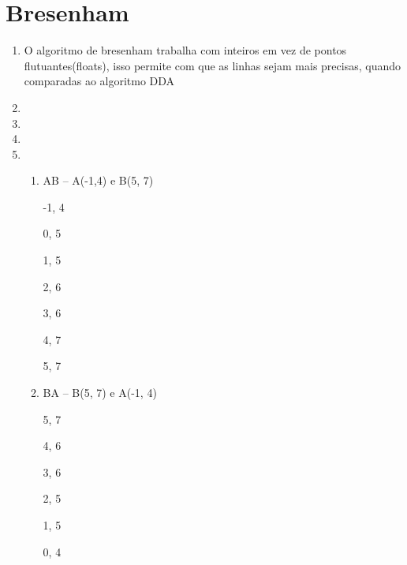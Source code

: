 \section*{Bresenham}

\begin{question}

	\begin{enumerate}\addtocounter{enumi}{10}
	
		\item O algoritmo de bresenham trabalha com inteiros em vez de pontos flutuantes(floats),
		isso permite com que as linhas sejam mais precisas, quando comparadas ao algoritmo DDA
		
		\item 

		\item 

		\item 

        \item \begin{enumerate}[label=\alph*.]
				   \setlength\itemsep{1em}
					\item	 AB – A(-1,4) e B(5, 7)
					   				
                       -1, 4
                       
                        0, 5
                        
                        1, 5
                        
                       2, 6
                       
                       3, 6
                       
                       4, 7
                       
                        5, 7
					
					\item    BA – B(5, 7) e A(-1, 4)
					
                           5, 7
                           
                          4, 6
                          
                          3, 6
                          
                          2, 5
                          
                          1, 5
                          
                         0, 4
                         

\end{enumerate}
\end{enumerate}
\end{question}
